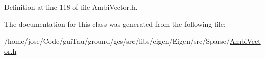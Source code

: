 Definition at line 118 of file Ambi\-Vector.\-h.



The documentation for this class was generated from the following file\-:\begin{DoxyCompactItemize}
\item 
/home/jose/\-Code/gui\-Tau/ground/gcs/src/libs/eigen/\-Eigen/src/\-Sparse/\hyperlink{_ambi_vector_8h}{Ambi\-Vector.\-h}\end{DoxyCompactItemize}

